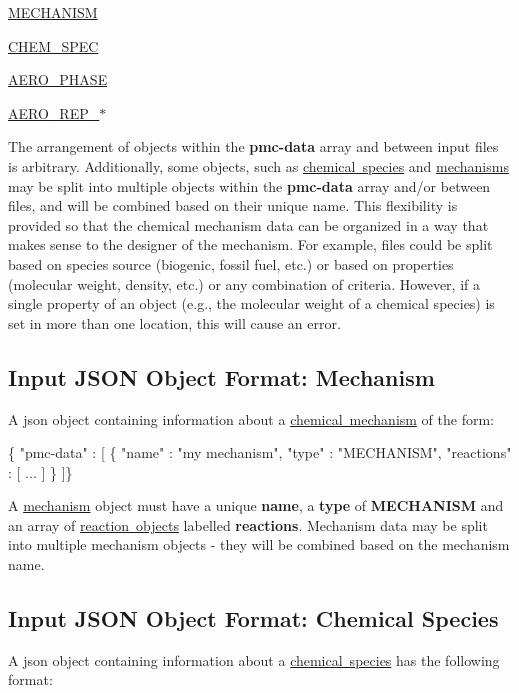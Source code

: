 \begin{DoxyItemize}
\item \mbox{\hyperlink{input_format_mechanism}{M\+E\+C\+H\+A\+N\+I\+SM}}
\item \mbox{\hyperlink{input_format_species}{C\+H\+E\+M\+\_\+\+S\+P\+EC}}
\item \mbox{\hyperlink{input_format_aero_phase}{A\+E\+R\+O\+\_\+\+P\+H\+A\+SE}}
\item \mbox{\hyperlink{input_format_aero_rep}{A\+E\+R\+O\+\_\+\+R\+E\+P\+\_\+$\ast$}}
\end{DoxyItemize}

The arrangement of objects within the {\bfseries pmc-\/data} array and between input files is arbitrary. Additionally, some objects, such as \mbox{\hyperlink{input_format_species}{chemical species}} and \mbox{\hyperlink{input_format_mechanism}{mechanisms}} may be split into multiple objects within the {\bfseries pmc-\/data} array and/or between files, and will be combined based on their unique name. This flexibility is provided so that the chemical mechanism data can be organized in a way that makes sense to the designer of the mechanism. For example, files could be split based on species source (biogenic, fossil fuel, etc.) or based on properties (molecular weight, density, etc.) or any combination of criteria. However, if a single property of an object (e.\+g., the molecular weight of a chemical species) is set in more than one location, this will cause an error. \hypertarget{input_format_mechanism}{}\subsection{Input J\+S\+ON Object Format\+: Mechanism}\label{input_format_mechanism}
A {\ttfamily json} object containing information about a \mbox{\hyperlink{phlex_mechanism}{chemical mechanism}} of the form\+:


\begin{DoxyCode}
\{ "pmc-data" : [
  \{
    "name" : "my mechanism",
    "type" : "MECHANISM",
    "reactions" : [
      ...
    ]
  \}
]\}
\end{DoxyCode}
 A \mbox{\hyperlink{phlex_mechanism}{mechanism}} object must have a unique {\bfseries name}, a {\bfseries type} of {\bfseries M\+E\+C\+H\+A\+N\+I\+SM} and an array of \mbox{\hyperlink{input_format_rxn}{reaction objects}} labelled {\bfseries reactions}. Mechanism data may be split into multiple mechanism objects -\/ they will be combined based on the mechanism name. \hypertarget{input_format_species}{}\subsection{Input J\+S\+ON Object Format\+: Chemical Species}\label{input_format_species}
A {\ttfamily json} object containing information about a \mbox{\hyperlink{phlex_species}{chemical species}} has the following format\+:


